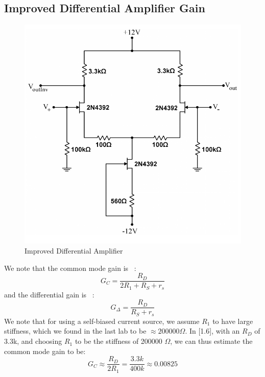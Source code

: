 \documentclass{article}
\begin{document}
\subsection{Improved Differential Amplifier Gain}
    \begin{figure}[H]
        \centering
        \includegraphics[scale = 0.6]{5_15.png}
        \caption{Improved Differential Amplifier ~\cite{webfig}}
        \label{fig:my_label}
    \end{figure}
    We note that the common mode gain is ~\cite{webfig}:
    \begin{equation}
        G_C = \frac{R_D}{2R_1 + R_S + r_s}
    \end{equation} 
    and the differential gain is ~\cite{webfig}:
    \begin{equation}
        G_{\Delta} = \frac{R_D}{R_S + r_s}
    \end{equation}
    We note that for using a self-biased current source, we assume $R_1$ to have large stiffness, which we found in the last lab to be $\approx 200000 \Omega$. In [1.6], with an $R_D$ of 3.3k, and choosing $R_1$ to be the stiffness of 200000 $\Omega$, we can thus estimate the common mode gain to be:
    \begin{equation}
        G_C \approx \frac{R_D}{2R_1} = \frac{3.3k}{400k} \approx 0.00825
    \end{equation} 
\end{document}
